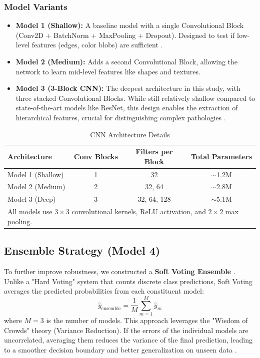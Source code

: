 \documentclass[12pt,a4paper]{article}
\begin{document}
\subsubsection{Model Variants}
\begin{itemize}
    \item \textbf{Model 1 (Shallow):} A baseline model with a single Convolutional Block (Conv2D + BatchNorm + MaxPooling + Dropout). Designed to test if low-level features (edges, color blobs) are sufficient \citep{CHEN2025109507}.
    \item \textbf{Model 2 (Medium):} Adds a second Convolutional Block, allowing the network to learn mid-level features like shapes and textures.
    \item \textbf{Model 3 (3-Block CNN):} The deepest architecture in this study, with three stacked Convolutional Blocks. While still relatively shallow compared to state-of-the-art models like ResNet, this design enables the extraction of hierarchical features, crucial for distinguishing complex pathologies \citep{Hasan2022, HaddadMohammed2025}.
\end{itemize}

\begin{table}[H]
\centering
\caption{CNN Architecture Details}
\label{tab:architecture}
\begin{tabular}{lccc}
\toprule
\textbf{Architecture} & \textbf{Conv Blocks} & \textbf{Filters per Block} & \textbf{Total Parameters} \\
\midrule
Model 1 (Shallow) & 1 & 32 & $\sim$1.2M \\
Model 2 (Medium) & 2 & 32, 64 & $\sim$2.8M \\
Model 3 (Deep) & 3 & 32, 64, 128 & $\sim$5.1M \\
\bottomrule
\multicolumn{4}{l}{\footnotesize All models use $3\times3$ convolutional kernels, ReLU activation, and $2\times2$ max pooling.}
\end{tabular}
\end{table}

\subsection{Ensemble Strategy (Model 4)}
To further improve robustness, we constructed a \textbf{Soft Voting Ensemble} \citep{BejaniGhatee2021}. Unlike a "Hard Voting" system that counts discrete class predictions, Soft Voting averages the predicted probabilities from each constituent model:
\begin{equation}
    \hat{y}_{\text{ensemble}} = \frac{1}{M} \sum_{m=1}^{M} \hat{y}_m
\end{equation}
where $M=3$ is the number of models. This approach leverages the "Wisdom of Crowds" theory (Variance Reduction). If the errors of the individual models are uncorrelated, averaging them reduces the variance of the final prediction, leading to a smoother decision boundary and better generalization on unseen data \citep{CHEN2025109507}.
\end{document}
